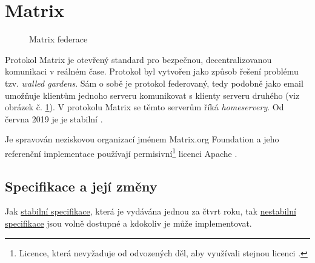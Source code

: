 \section{Matrix}\label{matrix}

\begin{figure}[h]
    \centering
    \caption{Matrix federace}
    \label{federation}
\end{figure}

Protokol Matrix je otevřený standard pro bezpečnou, decentralizovanou komunikaci
v reálném čase. Protokol byl vytvořen jako způsob řešení problému tzv.
\textit{walled gardens}. Sám o sobě je protokol federovaný, tedy podobně jako
email umožňuje klientům jednoho serveru komunikovat s klienty serveru druhého
(viz obrázek č. \ref{federation}). V protokolu Matrix se těmto serverům říká
\textit{homeservery}. Od června 2019 je je stabilní
\cite{MatrixORG-FAQ,MatrixORG-Homepage}.

Je spravován neziskovou organizací jménem Matrix.org Foundation a jeho
referenční implementace používají permisivní\footnote{Licence, která nevyžaduje
    od odvozených děl, aby využívali stejnou licenci
    \cite{MUNI-FI-VerejneLicenceVCR}.} licenci Apache \cite{MatrixORG-Homepage}.

\subsection{Specifikace a její změny}

Jak \href{https://spec.matrix.org/latest/}{stabilní specifikace}, která je
vydávána jednou za čtvrt roku, tak
\href{https://spec.matrix.org/unstable/}{nestabilní specifikace} jsou volně
dostupné a kdokoliv je může implementovat.

